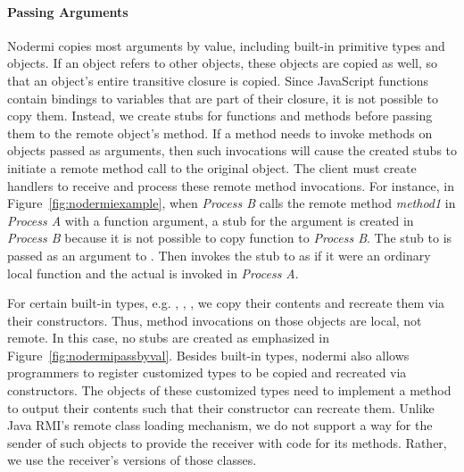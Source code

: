 \paragraph{Passing Arguments}
Nodermi copies most arguments by value, including built-in primitive types
and objects.  If an object refers to other objects, these objects are copied
as well, so that an object's entire transitive closure is copied.
Since JavaScript functions contain bindings to variables that are part of
their closure, it is not possible to copy them.
Instead, we create stubs for functions and methods before passing them
to the remote object's method.  If a method needs to invoke
methods on objects passed as arguments, then such invocations
will cause the created stubs to initiate a remote method
call to the original object.  The client must create handlers
to receive and process these remote method invocations.
For instance, in Figure~\ref{fig:nodermiexample},
when \emph{Process B} calls the remote method \emph{method1}
in \emph{Process A} with a function argument,
a stub for the argument
 is created in \emph{Process B} because
it is not possible to copy function  to \emph{Process B}.
The stub to  is passed as an argument to
 .
Then  invokes the stub to  as if it were an ordinary
 local function and the actual  is invoked in \emph{Process A}.


\nodrmipassbyvalfig{}

For certain built-in types, e.g. , , ,
we copy their contents and recreate them via their constructors.
Thus, method invocations on those objects are local, not remote.
In this case, no stubs are created as emphasized in Figure~\ref{fig:nodermipassbyval}.
Besides built-in types, nodermi also allows programmers to
register customized types to be copied and recreated via constructors.
The objects of these customized types need to implement a method to output
their contents such that their constructor can recreate them.
Unlike Java RMI\cite{j2eedoc}'s remote class loading mechanism, we do
not support a way for the sender of such objects to provide the receiver
with code for its methods.  Rather, we use the receiver's versions of
those classes.

\nodermipassbyreffig{}

\nodermipassstubbyreffig{}

